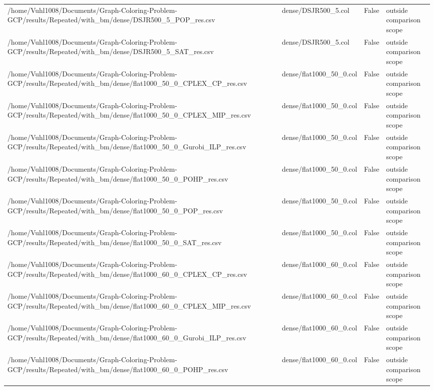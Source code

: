 \begin{table}[htbp]
\begin{tabular}{llll}
/home/Vuhl1008/Documents/Graph-Coloring-Problem-GCP/results/Repeated/with\_bm/dense/DSJR500\_5\_POP\_res.csv & dense/DSJR500\_5.col & False & outside comparison scope \\
/home/Vuhl1008/Documents/Graph-Coloring-Problem-GCP/results/Repeated/with\_bm/dense/DSJR500\_5\_SAT\_res.csv & dense/DSJR500\_5.col & False & outside comparison scope \\
/home/Vuhl1008/Documents/Graph-Coloring-Problem-GCP/results/Repeated/with\_bm/dense/flat1000\_50\_0\_CPLEX\_CP\_res.csv & dense/flat1000\_50\_0.col & False & outside comparison scope \\
/home/Vuhl1008/Documents/Graph-Coloring-Problem-GCP/results/Repeated/with\_bm/dense/flat1000\_50\_0\_CPLEX\_MIP\_res.csv & dense/flat1000\_50\_0.col & False & outside comparison scope \\
/home/Vuhl1008/Documents/Graph-Coloring-Problem-GCP/results/Repeated/with\_bm/dense/flat1000\_50\_0\_Gurobi\_ILP\_res.csv & dense/flat1000\_50\_0.col & False & outside comparison scope \\
/home/Vuhl1008/Documents/Graph-Coloring-Problem-GCP/results/Repeated/with\_bm/dense/flat1000\_50\_0\_POHP\_res.csv & dense/flat1000\_50\_0.col & False & outside comparison scope \\
/home/Vuhl1008/Documents/Graph-Coloring-Problem-GCP/results/Repeated/with\_bm/dense/flat1000\_50\_0\_POP\_res.csv & dense/flat1000\_50\_0.col & False & outside comparison scope \\
/home/Vuhl1008/Documents/Graph-Coloring-Problem-GCP/results/Repeated/with\_bm/dense/flat1000\_50\_0\_SAT\_res.csv & dense/flat1000\_50\_0.col & False & outside comparison scope \\
/home/Vuhl1008/Documents/Graph-Coloring-Problem-GCP/results/Repeated/with\_bm/dense/flat1000\_60\_0\_CPLEX\_CP\_res.csv & dense/flat1000\_60\_0.col & False & outside comparison scope \\
/home/Vuhl1008/Documents/Graph-Coloring-Problem-GCP/results/Repeated/with\_bm/dense/flat1000\_60\_0\_CPLEX\_MIP\_res.csv & dense/flat1000\_60\_0.col & False & outside comparison scope \\
/home/Vuhl1008/Documents/Graph-Coloring-Problem-GCP/results/Repeated/with\_bm/dense/flat1000\_60\_0\_Gurobi\_ILP\_res.csv & dense/flat1000\_60\_0.col & False & outside comparison scope \\
/home/Vuhl1008/Documents/Graph-Coloring-Problem-GCP/results/Repeated/with\_bm/dense/flat1000\_60\_0\_POHP\_res.csv & dense/flat1000\_60\_0.col & False & outside comparison scope \\

\end{tabular}
\end{table}
